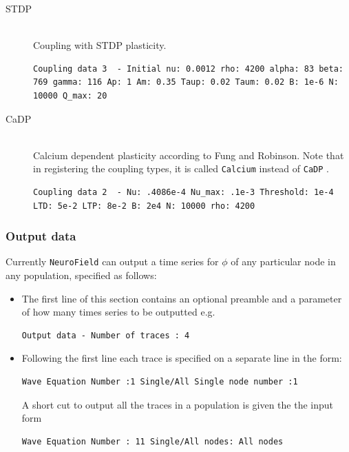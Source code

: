 \documentclass[12pt,a4paper]{article}
\newcommand{\type}[1]{ {\small\small\tt #1} }
\begin{document}
\begin{itemize}
\begin{description}
	\item[STDP]\ \\
	Coupling with STDP plasticity.
	\begin{lstlisting}
Coupling data 3  - Initial nu: 0.0012 rho: 4200 alpha: 83 beta: 769 gamma: 116 Ap: 1 Am: 0.35 Taup: 0.02 Taum: 0.02 B: 1e-6 N: 10000 Q_max: 20
	\end{lstlisting}

	\item[CaDP]\ \\
	Calcium dependent plasticity according to Fung and Robinson. Note that in registering the coupling types, it is called \type{Calcium} instead of \type{CaDP}.
	\begin{lstlisting}
Coupling data 2  - Nu: .4086e-4 Nu_max: .1e-3 Threshold: 1e-4 LTD: 5e-2 LTP: 8e-2 B: 2e4 N: 10000 rho: 4200
	\end{lstlisting}

\end{description}
\end{itemize}

\subsubsection{Output data}
\label{sec:output}

Currently \type{NeuroField} can output a time series for $\phi$ of any particular node in any population, specified as follows:

\begin{itemize}
\item The first line of this section contains an optional preamble and a parameter of how many times series to be outputted e.g.
\begin{lstlisting}
Output data - Number of traces : 4
\end{lstlisting}

\item Following the first line each trace is specified on a separate line in the form:
\begin{lstlisting}
Wave Equation Number :1 Single/All Single node number :1
\end{lstlisting}

A short cut to output all the traces in a population is given the the
input form
\begin{lstlisting}
Wave Equation Number : 11 Single/All nodes: All nodes
\end{lstlisting}

\end{itemize}
\end{document}

